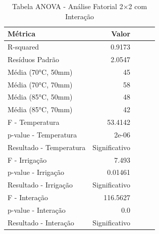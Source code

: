 \begin{table}[H]
\centering
\caption{Tabela ANOVA - Análise Fatorial 2×2 com Interação}
\label{tab:anova_fatorial}
\begin{tabular}{lrrrr}
\toprule
Métrica & Valor \\
\midrule
R-squared & 0.9173 \\
Resíduos Padrão & 2.0547 \\
Média (70°C, 50mm) & 45 \\
Média (70°C, 70mm) & 58 \\
Média (85°C, 50mm) & 48 \\
Média (85°C, 70mm) & 42 \\
F - Temperatura & 53.4142 \\
p-value - Temperatura & 2e-06 \\
Resultado - Temperatura & Significativo \\
F - Irrigação & 7.493 \\
p-value - Irrigação & 0.01461 \\
Resultado - Irrigação & Significativo \\
F - Interação & 116.5627 \\
p-value - Interação & 0.0 \\
Resultado - Interação & Significativo \\
\bottomrule
\end{tabular}
\end{table}